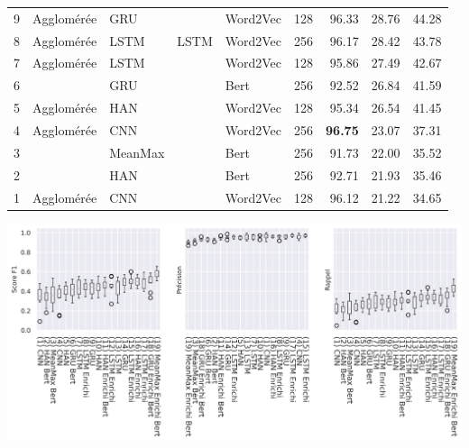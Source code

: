 \begin{minipage}{\linewidth}
{\begin{tabular}{r|lllll|rrr}
         9 &  Agglomérée &      GRU &                &   Word2Vec &            128 &      96.33 &   28.76 &     44.28 \\
         8 &  Agglomérée &     LSTM &           LSTM &   Word2Vec &            256 &      96.17 &   28.42 &     43.78 \\
         7 &  Agglomérée &     LSTM &                &   Word2Vec &            128 &      95.86 &   27.49 &     42.67 \\
         6 &             &      GRU &                &       Bert &            256 &      92.52 &   26.84 &     41.59 \\
         5 &  Agglomérée &      HAN &                &   Word2Vec &            128 &      95.34 &   26.54 &     41.45 \\
         4 &  Agglomérée &      CNN &                &   Word2Vec &            256 &      \textbf{96.75} &   23.07 &     37.31 \\
         3 &             &  MeanMax &                &       Bert &            256 &      91.73 &   22.00 &     35.52 \\
         2 &             &      HAN &                &       Bert &            256 &      92.71 &   21.93 &     35.46 \\
         1 &  Agglomérée &      CNN &                &   Word2Vec &            128 &      96.12 &   21.22 &     34.65 \\
    \bottomrule
    \end{tabular}%
    }
    \label{tab:chap4:metaphor-results}
    \includegraphics[width=\linewidth]{figures/chap4/metaphors-dispersionscores.png}
    \label{fig:chap4:metaphor-results-dispersion}
\end{minipage}

